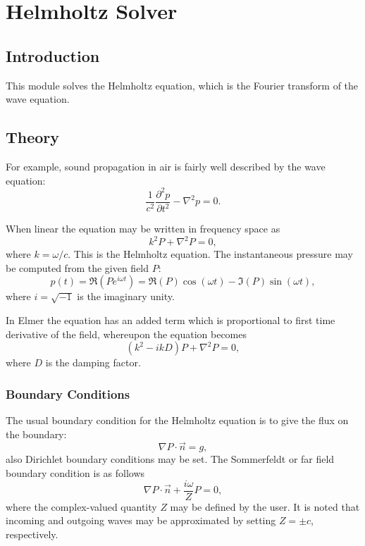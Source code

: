 \chapter{Helmholtz Solver}


\section{Introduction}

This module solves the Helmholtz equation, which is the Fourier transform
of the wave equation. 

\section{Theory}

For example, sound propagation in air is fairly well described by the
wave equation:
\begin{equation}
\frac{1}{c^2}\frac{\partial^2 p}{\partial t^2} - \nabla^2p  = 0.
\end{equation}

When linear the equation may be written in frequency space as
\begin{equation}
k^2 P + \nabla^2P  = 0,
\end{equation}
where $k=\omega/c$.
This is the Helmholtz equation.
The instantaneous pressure may be computed
from the given field $P$:
\begin{equation}
p(t) = \Re(P e^{i\omega t}) = \Re(P)\cos(\omega t) - \Im(P)\sin(\omega t),
\end{equation}
where $i=\sqrt{-1}$ is the imaginary unity.

In Elmer  the equation has an added term which is proportional
to first time derivative of the field, whereupon the equation becomes
\begin{equation}
(k^2 - ikD)P + \nabla^2P  = 0,
\label{eq-sdamp}
\end{equation}
where $D$ is the damping factor.


\subsection{Boundary Conditions}

The usual boundary condition for the Helmholtz equation is to
give the flux on the boundary:
\begin{equation}
\nabla P\cdot\Vec{n} = g,
\end{equation}
also Dirichlet boundary conditions may be set.
The Sommerfeldt or far field boundary condition is as follows
\begin{equation}\label{Sommerfeldt-bc}
\nabla P\cdot\Vec{n} + \frac{i\omega}{Z}P = 0,
\end{equation}
where the complex-valued quantity $Z$ may be defined by the user.
It is noted that incoming and outgoing waves may be approximated by
setting $Z=\pm c$, respectively.


